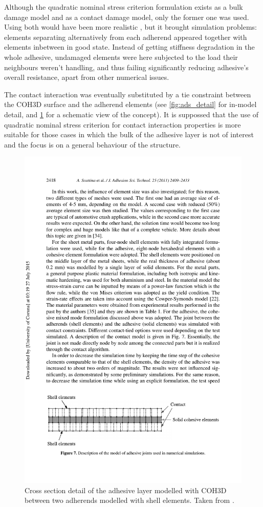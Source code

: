 \documentclass[cmfonts]{witpress}
\begin{document}
Although the quadratic nominal stress criterion formulation exists as a bulk damage model and as a contact damage model, only the former one was used. Using both would have been more realistic \cite{Wu2013}, but it brought simulation problems: elements separating alternatively from each adherend appeared together with elements inbetween in good state. Instead of getting stiffness degradation in the whole adhesive, undamaged elements were here subjected to the load their neighbours weren't handling, and thus failing significantly reducing adhesive's overall resistance, apart from other numerical issues.

The contact interaction was eventually substituted by a tie constraint between the COH3D surface and the adherend elements (see \cref{fig:ads_detail} for in-model detail, and \cref{fig:union} for a schematic view of the concept). It is suppossed that the use of quadratic nominal stress criterion for contact interaction properties is more suitable for those cases in which the bulk of the adhesive layer is not of interest and the focus is on a general behaviour of the structure.

\begin{figure}
	\centering
	\includegraphics[width=0.7\linewidth]{figures/IMG_CUTRES/union}
	\caption[Cross section detail of the adhesive layer modelled with COH3D between two adherends modelled with shell elements.]{Cross section detail of the adhesive layer modelled with COH3D between two adherends modelled with shell elements. Taken from \cite{Scattina2011}.}
	\label{fig:union}
\end{figure}
\end{document}
